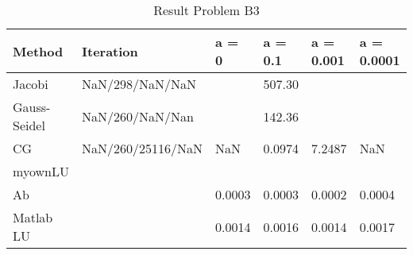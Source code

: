 \documentclass[a4paper]{article}
\begin{document}
\begin{table}[ht!]
\centering
\begin{tabular}{llllll}
\textbf{Method}& \textbf{Iteration}& a = 0 & a = 0.1 & a = 0.001 & a = 0.0001 \\ \hline
Jacobi&NaN/298/NaN/NaN  & &507.30& &  \\
Gauss-Seidel& NaN/260/NaN/Nan  & &142.36 & &  \\ 
CG&  NaN/260/25116/NaN&NaN & 0.0974& 7.2487&NaN \\
myownLU& & & & &\\
Ab& & 0.0003& 0.0003& 0.0002& 0.0004\\
Matlab LU& & 0.0014& 0.0016& 0.0014& 0.0017\\\hline
\end{tabular}
\caption{Result Problem B3}
\label{tab:tab1}
\end{table}




\end{document}
